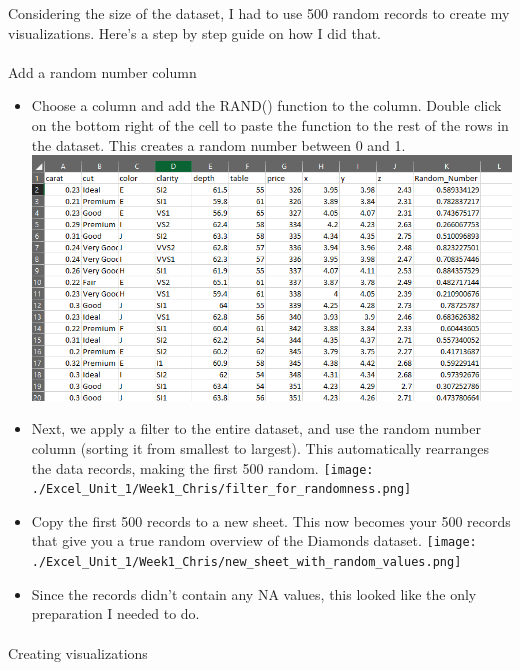 \documentclass[
  letterpaper,
  DIV=11,
  numbers=noendperiod]{scrreprt}
\makeatletter
\let\oldparagraph\paragraph
\renewcommand{\paragraph}{
    \@ifstar
      \xxxParagraphStar
      \xxxParagraphNoStar
  }
\newcommand{\xxxParagraphStar}[1]{\oldparagraph*{#1}\mbox{}}
\newcommand{\xxxParagraphNoStar}[1]{\oldparagraph{#1}\mbox{}}
\providecommand{\tightlist}{%
  \setlength{\itemsep}{0pt}\setlength{\parskip}{0pt}}\usepackage{longtable,booktabs,array}
\makeatother
\begin{document}
Considering the size of the dataset, I had to use 500 random records to
create my visualizations. Here's a step by step guide on how I did that.

\paragraph{Add a random number column}\label{add-a-random-number-column}

\begin{itemize}
\tightlist
\item
  Choose a column and add the RAND() function to the column. Double
  click on the bottom right of the cell to paste the function to the
  rest of the rows in the dataset. This creates a random number between
  0 and 1.
  \includegraphics{./Excel_1_Unit/Week1_Chris/random_number_column.png}
\item
  Next, we apply a filter to the entire dataset, and use the random
  number column (sorting it from smallest to largest). This
  automatically rearranges the data records, making the first 500
  random.
  \texttt{[image: ./Excel\_Unit\_1/Week1\_Chris/filter\_for\_randomness.png]}
\item
  Copy the first 500 records to a new sheet. This now becomes your 500
  records that give you a true random overview of the Diamonds dataset.
  \texttt{[image: ./Excel\_Unit\_1/Week1\_Chris/new\_sheet\_with\_random\_values.png]}
\item
  Since the records didn't contain any NA values, this looked like the
  only preparation I needed to do.
\end{itemize}

\paragraph{Creating visualizations}\label{creating-visualizations}
\end{document}
